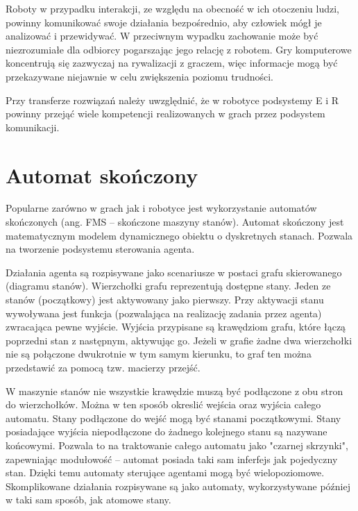 Roboty w przypadku interakcji, ze względu na obecność w ich otoczeniu ludzi, powinny komunikować swoje działania bezpośrednio, aby człowiek mógł je analizować i przewidywać. W przeciwnym wypadku zachowanie może być niezrozumiałe dla odbiorcy pogarszając jego relację z robotem. Gry komputerowe koncentrują się zazwyczaj na rywalizacji z graczem, więc informacje mogą być przekazywane niejawnie w celu zwiększenia poziomu trudności.

Przy transferze rozwiązań należy uwzględnić, że w robotyce podsystemy E i R powinny przejąć wiele kompetencji realizowanych w grach przez podsystem komunikacji.



\section{Automat skończony}

Popularne zarówno w grach jak i robotyce jest wykorzystanie automatów skończonych (ang. FMS – skończone maszyny stanów). Automat skończony jest matematycznym modelem dynamicznego obiektu o dyskretnych stanach. Pozwala na tworzenie podsystemu sterowania agenta.

Działania agenta są rozpisywane jako scenariusze w postaci grafu skierowanego (diagramu stanów). Wierzchołki grafu reprezentują dostępne stany. Jeden ze stanów (początkowy) jest aktywowany jako pierwszy. Przy aktywacji stanu wywoływana jest funkcja (pozwalająca na realizację zadania przez agenta) zwracająca pewne wyjście. Wyjścia przypisane są krawędziom grafu, które łączą poprzedni stan z następnym, aktywując go. Jeżeli w grafie żadne dwa wierzchołki nie są połączone dwukrotnie w tym samym kierunku, to graf ten można przedstawić za pomocą tzw. macierzy przejść.

W maszynie stanów nie wszystkie krawędzie muszą być podłączone z obu stron do wierzchołków. Można w ten sposób okreslić wejścia oraz wyjścia całego automatu. Stany podłączone do wejść mogą być stanami początkowymi. Stany posiadające wyjścia niepodłączone do żadnego kolejnego stanu są nazywane końcowymi. Pozwala to na traktowanie całego automatu jako "czarnej skrzynki", zapewniając modułowość – automat posiada taki sam inferfejs jak pojedyczny stan. Dzięki temu automaty sterujące agentami mogą być wielopoziomowe. Skomplikowane działania rozpisywane są jako automaty, wykorzystywane później w taki sam sposób, jak atomowe stany.


